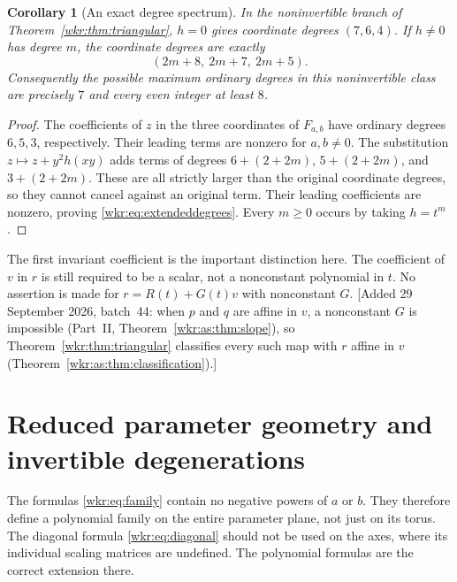 \documentclass[11pt,a4paper]{article}
\numberwithin{equation}{section}
\newtheorem{corollary}[theorem]{Corollary}
\theoremstyle{definition}
\theoremstyle{remark}
\begin{document}
\begin{corollary}[An exact degree spectrum]\label{wkr:cor:degreespectrum}
In the noninvertible branch of Theorem~\ref{wkr:thm:triangular}, $h=0$ gives
coordinate degrees $(7,6,4)$. If $h\ne0$ has degree $m$, the coordinate
degrees are exactly
\begin{equation}\label{wkr:eq:extendeddegrees}
(2m+8,\ 2m+7,\ 2m+5).
\end{equation}
Consequently the possible maximum ordinary degrees in this noninvertible
class are precisely $7$ and every even integer at least $8$.
\end{corollary}
\begin{proof}
The coefficients of $z$ in the three coordinates of $F_{a,b}$ have
ordinary degrees $6,5,3$, respectively. Their leading terms are nonzero
for $a,b\ne0$. The substitution $z\mapsto z+y^2h(xy)$ adds terms of
degrees $6+(2+2m)$, $5+(2+2m)$, and $3+(2+2m)$. These are all strictly
larger than the original coordinate degrees, so they cannot cancel against
an original term. Their leading coefficients are nonzero, proving
\eqref{wkr:eq:extendeddegrees}. Every $m\ge0$ occurs by taking $h=t^m$.
\end{proof}

The first invariant coefficient is the important distinction here. The
coefficient of $v$ in $r$ is still required to be a scalar, not a
nonconstant polynomial in $t$. No assertion is made for
$r=R(t)+G(t)v$ with nonconstant $G$.
[Added 29 September 2026, batch~44: when $p$ and $q$ are affine in $v$,
a nonconstant $G$ is impossible (Part~II,
Theorem~\ref{wkr:as:thm:slope}), so Theorem~\ref{wkr:thm:triangular}
classifies every such map with $r$ affine in $v$
(Theorem~\ref{wkr:as:thm:classification}).]

\section{Reduced parameter geometry and invertible degenerations}
\label{wkr:sec:geometry}

The formulas \eqref{wkr:eq:family} contain no negative powers of $a$ or $b$.
They therefore define a polynomial family on the entire parameter plane,
not just on its torus. The diagonal formula \eqref{wkr:eq:diagonal} should not
be used on the axes, where its individual scaling matrices are undefined.
The polynomial formulas are the correct extension there.
\end{document}
